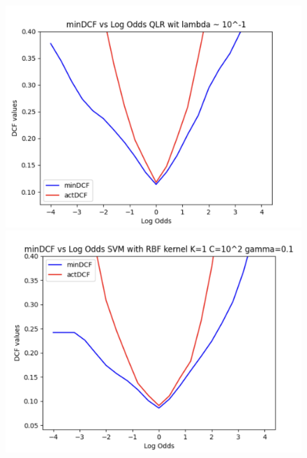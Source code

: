 \documentclass{article}
\begin{document}
\begin{figure}[H]
    \centering
    \begin{minipage}{.3\textwidth}
        \centering
        \includegraphics[width=\linewidth]{./img/BestQLR.png}
    \end{minipage}%
    \begin{minipage}{.3\textwidth}
        \centering
        \includegraphics[width=\linewidth]{./img/BestSVM.png}
    \end{minipage}
    \begin{minipage}{.3\textwidth}
        \centering

\end{minipage}
\end{figure}
\end{document}
